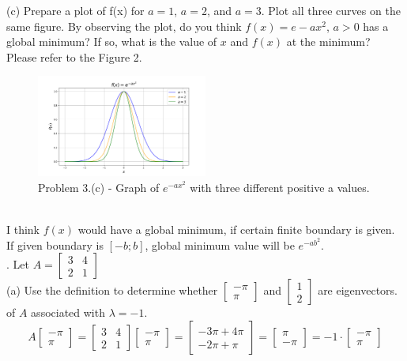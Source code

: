 \documentclass{article} %
\begin{document}
{    \noindent (c) Prepare a plot of f(x) for $ a = 1 $, $ a = 2 $, and $ a = 3 $. Plot all three curves on the same figure. By
    observing the plot, do you think $ f(x) = e - ax^2 $, $ a > 0 $ has a global minimum? If so, what is the
    value of $ x $ and $ f(x) $ at the minimum? \\
    
    Please refer to the Figure 2.
        \begin{figure}[h!]
        \centering
        \includegraphics[width=0.5\textwidth]{generated_image2.png}
        \caption{Problem 3.(c) - Graph of $e^{-ax^2}$ with three different positive a values.}
        \label{fig2}
        \end{figure} \\
    I think $f(x)$ would have a global minimum, if certain finite boundary is given.
    If given boundary is $[-b; b]$, global minimum value will be $e^{-ab^2}$. \\

    . Let $ A = \begin{bmatrix} 3 & 4 \\ 2 & 1 \end{bmatrix} $ \\ %
    (a) Use the definition to determine whether $ \begin{bmatrix} -\pi \\ \pi \end{bmatrix} $ and $ \begin{bmatrix} 1 \\ 2 \end{bmatrix} $
    are eigenvectors. of $ A $ associated with $ \lambda = -1 $. \\

    \[
        A \begin{bmatrix} -\pi \\ \pi \end{bmatrix}
        = \begin{bmatrix} 3 & 4 \\ 2 & 1 \end{bmatrix}
        \begin{bmatrix} -\pi \\ \pi \end{bmatrix}
        = \begin{bmatrix} -3\pi + 4\pi \\ -2\pi + \pi \end{bmatrix}
        = \begin{bmatrix} \pi \\ -\pi \end{bmatrix}
        = -1 \cdot \begin{bmatrix} -\pi \\ \pi \end{bmatrix}
    \]

}
\end{document}
